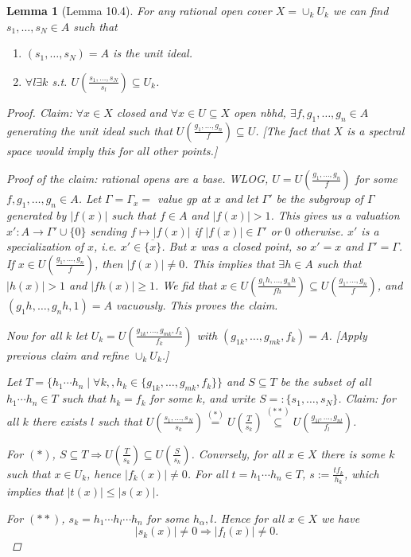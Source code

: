\documentclass[A4paper, british, reqno]{amsart}
\theoremstyle{darkgreentheorem}
\newtheorem{lm}[thm]{Lemma}
\theoremstyle{darkbluedefinition}
\theoremstyle{darkredexample}
\theoremstyle{remark}
\newcommand{\1}{\mathbbm{1}}
\newcommand{\sub}{\subseteq}
\begin{document}
\begin{lm}[Lemma 10.4]
    For any rational open cover $X=\cup_{k}U_{k}$ we can find $s_{1},\ldots, s_{N}\in A$ such that
    \begin{enumerate}
	\item $(s_{1},\ldots,s_{N})=A$ is the unit ideal.
	\item $\forall l\exists k $ s.t. $U(\frac{s_{1},\ldots,s_{N}}{s_{l}})\sub U_{k}$.
    \end{enumerate}
    \begin{proof}
	Claim: $\forall x\in X$ closed and $\forall x\in U\sub X$ open nbhd, $\exists f,g_{1},\ldots,g_{n}\in A$ generating the unit ideal such that $U(\frac{g_{1},\ldots,g_{n}}{f})\sub U$.
	[The fact that $X$ is a spectral space would imply this for all other points.]

	Proof of the claim: rational opens are a base.
	WLOG, $U=U(\frac{g_{1},\ldots,g_{n}}{f})$ for some $f,g_{1},\ldots,g_{n}\in A$.
	Let $\Gamma=\Gamma_{x}=$ value gp at $x$ and let $\Gamma'$ be the subgroup of $\Gamma$ generated by $|f(x)|$ such that $f\in A$ and $|f(x)|>1$.
	This gives us a valuation $x'\colon A\to \Gamma'\cup \{0\}$ sending $f\mapsto |f(x)| $ if $|f(x)|\in \Gamma'$ or $0$ otherwise.
	$x'$ is a specialization of $x$, i.e. $x'\in \overline{\{x \}}$.
	But $x$ was a closed point, so $x'=x$ and $\Gamma'=\Gamma$.
	If $x\in U(\frac{g_{1},\ldots,g_{n}}{f})$, then $|f(x)|\neq 0$.
	This implies that $\exists h\in A$ such that $|h(x)|>1$ and $|fh(x)|\geqslant 1$.
	We fid that $x\in U(\frac{g_{1}h,\ldots,g_{n}h}{fh})\sub U(\frac{g_{1},\ldots,g_{n}}{f})$, and $(g_{1}h,\ldots,g_{n}h,1)=A$ vacuously.
	This proves the claim.

	Now for all $k$ let $U_{k}=U(\frac{g_{1k},\ldots,g_{mk},f_{k}}{f_{k}})$ with $(g_{1k},\ldots,g_{mk},f_{k})=A$.
	[Apply previous claim and refine $\cup_{k}U_{k}$.]

	Let $T=\{h_{1}\cdots h_{n}\mid \forall k,, h_{k}\in \{g_{1k},\ldots,g_{mk},f_{k}\}\}$ and $S\sub T$ be the subset of all $h_{1}\cdots h_{n}\in T$ such that $h_{k}=f_{k}$ for some $k$, and write $S=:\{s_{1},\ldots,s_{N}\}$.
	Claim: for all $k$ there exists $l$ such that $U(\frac{s_{1},\ldots,s_{N}}{s_{k}})\overset{(*)}{=}U(\frac{T}{s_{k}})\overset{(**)}{\sub} U(\frac{g_{1l},\ldots,g_{nl}}{f_{l}})$.

	For $(*)$, $S\sub T\Rightarrow U(\frac{T}{s_{k}})\sub U(\frac{S}{s_{k}})$.
	Convrsely, for all $x\in X$ there is some $k$ such that $x\in U_{k}$, hence $|f_{k}(x)|\neq 0$.
	For all $t=h_{1}\cdots h_{n}\in T$, $s:=\frac{tf_{k}}{h_{k}}$, which implies that $|t(x)|\leqslant |s(x)|$.

	For $(**)$, $s_{k}=h_{1}\cdots h_{l}\cdots h_{n}$ for some $h_{\alpha},l$.
	Hence for all $x\in X$ we have
	\[ |s_{k}(x)|\neq 0 \Rightarrow |f_{l}(x)|\neq 0. \]
    \end{proof}
\end{lm}
\end{document}
